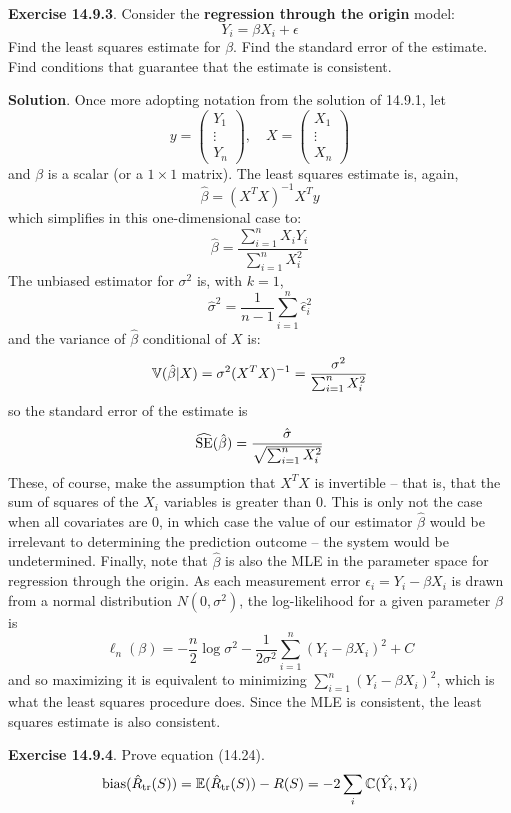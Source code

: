 \textbf{Exercise 14.9.3}. Consider the \textbf{regression through the
origin} model:
\[
Y_{i} = \beta X_{i} + \epsilon
\]
Find the least squares estimate for \(\beta\). Find the standard error
of the estimate. Find conditions that guarantee that the estimate is
consistent.

\textbf{Solution}. Once more adopting notation from the solution of
14.9.1, let
\[
y = \begin{pmatrix} Y_{1} \\ \vdots \\ Y_{n} \end{pmatrix},
\quad
X = \begin{pmatrix} X_{1} \\ \vdots \\ X_{n} \end{pmatrix}
\]
and \(\beta\) is a scalar (or a \(1 \times 1\) matrix).
The least squares estimate is, again,
\[
\hat{\beta} = (X^T X)^{-1} X^T y
\]
which simplifies in this one-dimensional case to:
\[
\hat{\beta} = \frac{\sum_{i=1}^{n} X_{i} Y_{i}}{\sum_{i=1}^{n} X_{i}^{2}}
\]
The unbiased estimator for \(\sigma^{2}\) is, with \(k = 1\),
\[
\hat{\sigma}^{2} = \frac{1}{n - 1} \sum_{i=1}^{n} \hat{\epsilon}_{i}^{2}
\]
and the variance of \(\hat{\beta}\) conditional of \(X\) is:
\[
\operatorname{\mathbb{V}}(\hat{\beta} | X) = \sigma^{2} (X^T X)^{-1} = \frac{\sigma^{2}}{\sum_{i=1}^{n} X_{i}^{2}}
\]
so the standard error of the estimate is
\[
\widehat{\operatorname{\mathrm{SE}}}(\hat{\beta}) = \frac{\hat{\sigma}}{\sqrt{\sum_{i=1}^{n} X_{i}^{2}}}
\]
These, of course, make the assumption that \(X^T X\) is invertible --
that is, that the sum of squares of the \(X_{i}\) variables is greater
than 0. This is only not the case when all covariates are 0, in which
case the value of our estimator \(\hat{\beta}\) would be irrelevant to
determining the prediction outcome -- the system would be undetermined.
Finally, note that \(\hat{\beta}\) is also the MLE in the parameter
space for regression through the origin. As each measurement error
\(\epsilon_{i} = Y_{i} - \beta X_{i}\) is drawn from a normal distribution
\(N(0, \sigma^{2})\), the log-likelihood for a given parameter \(\beta\)
is
\[
\ell_{n}(\beta) = -\frac{n}{2} \log \sigma^{2} - \frac{1}{2 \sigma^{2}} \sum_{i=1}^{n} (Y_{i} - \beta X_{i})^{2} + C
\]
and so maximizing it is equivalent to minimizing
\(\sum_{i=1}^{n} (Y_{i} - \beta X_{i})^{2}\), which is what the least squares
procedure does.
Since the MLE is consistent, the least squares estimate is also
consistent.

\textbf{Exercise 14.9.4}. Prove equation (14.24).
\[
\text{bias}(\hat{R}_\text{tr}(S)) = \operatorname{\mathbb{E}}(\hat{R}_\text{tr}(S)) - R(S) = -2 \sum_{i} \operatorname{\mathbb{C}}(\hat{Y}_{i}, Y_{i})
\]

